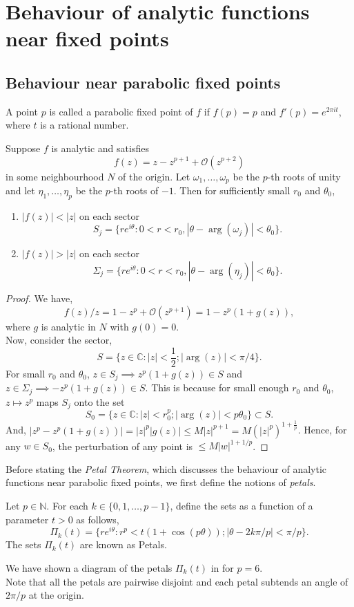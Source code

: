 \chapter{Behaviour of analytic functions near fixed points}
\section{Behaviour near parabolic fixed points}
A point \( p \) is called a parabolic fixed point of \( f \)
if \( f(p)=p \) and \( f'(p)=e^{2\pi i t} \), where \( t \)
is a rational number.

\begin{lemma}\label{lem2.1}
	Suppose \( f \) is analytic and satisfies \[
		f(z)=z-z^{p+1}+\mathcal{O}(z^{p+2})
	\] in some neighbourhood \( N \) of the origin. Let \( \omega_1,\ldots ,\omega_p \) be the \( p \)-th
	roots of unity and let \( \eta_1,\ldots ,\eta_p \) be the \( p \)-th roots of \( -1 \).
	Then for sufficiently small \( r_0 \) and \( \theta _0 \), 
	\begin{enumerate}
		\item \( |f(z)|<|z| \) on each sector \[
				S_j=\{re^{i\theta}:0<r<r_0,|\theta -\arg(\omega_j)|<\theta _0\}
		.\] 
	\item \( |f(z)|>|z| \) on each sector \[
				\Sigma_j=\{re^{i\theta}:0<r<r_0,|\theta -\arg(\eta_j)|<\theta _0\}
	.\] 
	\end{enumerate}
\end{lemma}
\begin{proof}
	We have, \[
		f(z) /z=1-z^p+\mathcal{O}(z^{p+1})=1-z^p(1+g(z))
	,\] where \( g \) is analytic in \( N \) with \( g(0)=0 \).\\
	Now, consider the sector, \[
		S=\{z\in \mathbb{C}:|z|<\frac{1}{2};|\arg(z)|<\pi /4\}
	.\] 
	For small \( r_0 \) and \( \theta_0 \), \( z\in S_j\implies z^p(1+g(z))\in S\) and \( z\in\Sigma_j\implies -z^p(1+g(z))\in S \). This is because for small enough \( r_0 \) and \( \theta_0 \), \( z\mapsto z^p \) maps \( S_j \) onto the set \[
		S_0=\{z\in \mathbb{C}:|z|<r_0^p;|\arg(z)|<p\theta_0\}\subset S
	.\] And, \( |z^p-z^p(1+g(z))|=|z|^p |g(z)|\le M|z|^{p+1}=M(|z|^p)^{1+\frac{1}{p}} \). Hence,
	for any \( w\in S_0 \), the perturbation of any point is \( \le M|w|^{1+1/p} \).

\end{proof}

Before stating the \emph{Petal Theorem}, which discusses the
behaviour of analytic functions near parabolic fixed points, we first define the notions
of \emph{petals}.
\begin{definition}[Petals]
	Let \( p\in \mathbb{N} \). For each \( k\in\{0,1,\ldots ,p-1\} \), define the sets as a function of a parameter \( t>0 \)
	as follows, \[
		\Pi_k(t)=\{re^{i\theta}:r^p<t(1+\cos (p\theta));|\theta-2k\pi /p|<\pi /p\}
	.\] 
	The sets \( \Pi_k(t) \) are known as Petals.
\end{definition}
We have shown a diagram of the petals \( \Pi_k(t) \) in  for \( p=6 \).\\
Note that all the petals are pairwise disjoint and each petal subtends an angle of \( 2\pi /p \) at the origin.

